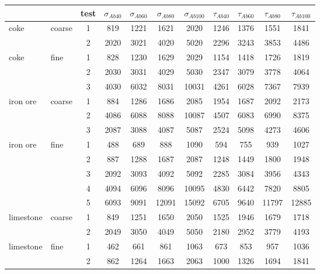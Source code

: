\begin{table}[h]
\centering
\begin{tabular}{ll|c|cccc|cccc}
\hline
          &       & test  & $\sigma_{Ab40}$ & $\sigma_{Ab60}$ & $\sigma_{Ab80}$ &
          $\sigma_{Ab100}$ & $\tau_{Ab40}$ & $\tau_{Ab60}$ & $\tau_{Ab80}$ &
          $\tau_{Ab100}$ \\
\hline          
    coke  & coarse & 1     & 819   & 1221  & 1621  & 2020  & 1246  & 1376  & 1551  & 1841 \\
          &       & 2     & 2020  & 3021  & 4020  & 5020  & 2296  & 3243  & 3853  & 4486 \\
\hline
    coke  & fine  & 1     & 828   & 1230  & 1629  & 2029  & 1154  & 1418  & 1726  & 1819 \\
          &       & 2     & 2030  & 3031  & 4029  & 5030  & 2347  & 3079  & 3778  & 4064 \\
          &       & 3     & 4030  & 6032  & 8031  & 10031 & 4261  & 6028  & 7367  & 7939 \\
\hline
    iron ore & coarse & 1     & 884   & 1286  & 1686  & 2085  & 1954  & 1687  & 2092  & 2173 \\
          &       & 2     & 4086  & 6088  & 8088  & 10087 & 4507  & 6083  & 6990  & 8375 \\
          &       & 3     & 2087  & 3088  & 4087  & 5087  & 2524  & 5098  & 4273  & 4606 \\
\hline
    iron ore & fine  & 1     & 488   & 689   & 888   & 1090  & 594   & 755   & 939   & 1027 \\
          &       & 2     & 887   & 1288  & 1687  & 2087  & 1248  & 1449  & 1800  & 1948 \\
          &       & 3     & 2092  & 3093  & 4092  & 5092  & 2285  & 3084  & 3956  & 4343 \\
          &       & 4     & 4094  & 6096  & 8096  & 10095 & 4830  & 6442  & 7820  & 8805 \\
          &       & 5     & 6093  & 9091  & 12091 & 15092 & 6705  & 9640  & 11797 & 12885 \\
\hline
    limestone & coarse & 1     & 849   & 1251  & 1650  & 2050  & 1525  & 1946  & 1679  & 1718 \\
          &       & 2     & 2049  & 3050  & 4049  & 5050  & 2180  & 2952  & 3779  & 4193 \\
\hline
    limestone & fine  & 1     & 462   & 661   & 861   & 1063  & 673   & 853   & 957   & 1036 \\
          &       & 2     & 862   & 1264  & 1663  & 2063  & 1000  & 1326  & 1694  & 1841 \\

\end{tabular}
\end{table}
